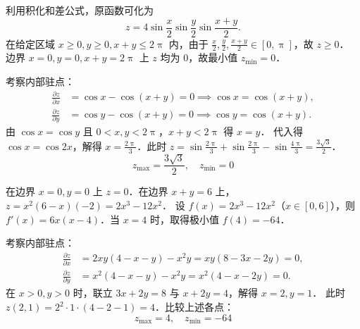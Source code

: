 \begin{solution}
    利用积化和差公式，原函数可化为
    \begin{equation}
        z = 4 \sin \frac{x}{2} \sin \frac{y}{2} \sin \frac{x + y}{2}.
    \end{equation}
    在给定区域 $x \ge 0, y \ge 0, x + y \le 2\uppi$ 内，由于 $\frac{x}{2}, \frac{y}{2}, \frac{x + y}{2} \in [0, \uppi]$，故 $z \ge 0$．
    边界 $x = 0, y = 0, x + y = 2\uppi$ 上 $z$ 均为 $0$，故最小值 $z_{\min} = 0$．

    考察内部驻点：
    \begin{equation}
        \begin{aligned}
            \frac{\partial z}{\partial x} & = \cos x - \cos(x + y) = 0 \implies \cos x = \cos(x + y), \\
            \frac{\partial z}{\partial y} & = \cos y - \cos(x + y) = 0 \implies \cos y = \cos(x + y).
        \end{aligned}
    \end{equation}
    由 $\cos x = \cos y$ 且 $0 < x, y < 2\uppi$，$x + y < 2\uppi$ 得 $x = y$．
    代入得 $\cos x = \cos 2x$，解得 $x = \frac{2\uppi}{3}$．此时 $z = \sin \frac{2\uppi}{3} + \sin \frac{2\uppi}{3} - \sin \frac{4\uppi}{3} = \frac{3\sqrt{3}}{2}$．
    \begin{equation}
        \boxed{z_{\max} = \frac{3\sqrt{3}}{2}, \quad z_{\min} = 0}
    \end{equation}

    在边界 $x = 0, y = 0$ 上 $z = 0$．在边界 $x + y = 6$ 上，$z = x^2(6 - x)(-2) = 2x^3 - 12x^2$．
    设 $f(x) = 2x^3 - 12x^2$（$x \in [0, 6]$），则 $f'(x) = 6x(x - 4)$．当 $x = 4$ 时，取得极小值 $f(4) = -64$．

    考察内部驻点：
    \begin{equation}
        \begin{aligned}
            \frac{\partial z}{\partial x} & = 2xy(4 - x - y) - x^2 y = xy(8 - 3x - 2y) = 0, \\
            \frac{\partial z}{\partial y} & = x^2(4 - x - y) - x^2 y = x^2(4 - x - 2y) = 0.
        \end{aligned}
    \end{equation}
    在 $x > 0, y > 0$ 时，联立 $3x + 2y = 8$ 与 $x + 2y = 4$，解得 $x = 2, y = 1$．
    此时 $z(2, 1) = 2^2 \cdot 1 \cdot (4 - 2 - 1) = 4$．比较上述各点：
    \begin{equation}
        \boxed{z_{\max} = 4, \quad z_{\min} = -64}
    \end{equation}
\end{solution}


